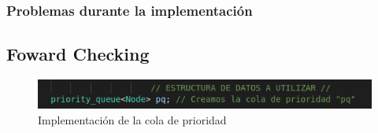 \documentclass[12pt]{article}
\begin{document}
\textbf{}

\subsubsection{Problemas durante la implementación}
\subsection{Foward Checking}
\begin{figure}[h]
    \centering
    \includegraphics[scale=0.5]{cola_de_prior.png}
    \caption{Implementación de la cola de prioridad}
    \label{fig:colprior}
\end{figure}

\section{}
\end{document}
